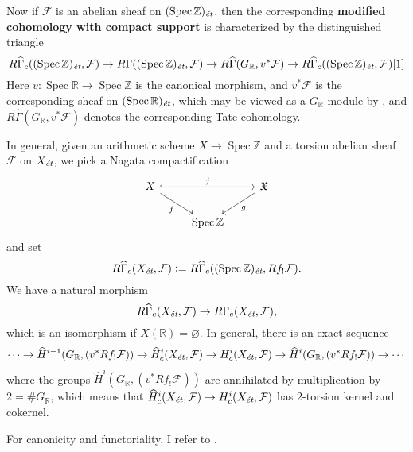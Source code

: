 \documentclass{article}
\DeclareMathOperator{\Spec}{Spec}
\newcommand{\RR}{\mathbb{R}}
\newcommand{\ZZ}{\mathbb{Z}}
\renewcommand{\emptyset}{\varnothing}
\newcommand{\et}{\text{\it ét}}
\newcommand{\dfn}{\mathrel{\mathop:}=}
\theoremstyle{definition}
\numberwithin{equation}{section}
\begin{document}
\begin{appendices}
Now if $\mathcal{F}$ is an abelian sheaf on $(\Spec \ZZ)_\et$, then the
corresponding \textbf{modified cohomology with compact support} is characterized
by the distinguished triangle
\[ R\widehat{\Gamma}_c ((\Spec \ZZ)_\et, \mathcal{F}) \to
R\Gamma ((\Spec \ZZ)_\et, \mathcal{F}) \to
R\widehat{\Gamma} (G_\RR, v^* \mathcal{F}) \to
R\widehat{\Gamma}_c ((\Spec \ZZ)_\et, \mathcal{F}) [1] \]
Here $v\colon \Spec \RR \to \Spec \ZZ$ is the canonical morphism, and
$v^* \mathcal{F}$ is the corresponding sheaf on $(\Spec \RR)_\et$, which may be
viewed as a $G_\RR$-module by \cite[Exposé~VII, 2.3]{SGA4}, and
$R\widehat{\Gamma} (G_\RR, v^* \mathcal{F})$ denotes the corresponding Tate
cohomology.

In general, given an arithmetic scheme $X \to \Spec \ZZ$ and a torsion abelian
sheaf $\mathcal{F}$ on $X_\et$, we pick a Nagata compactification
\[ \begin{tikzcd}
  X \ar[hookrightarrow]{rr}{j}\ar{dr}[swap]{f} & & \mathfrak{X} \ar{dl}{g} \\
  & \Spec \ZZ
\end{tikzcd} \]
and set
\[ R\widehat{\Gamma}_c (X_\et, \mathcal{F}) \dfn
R\widehat{\Gamma}_c ((\Spec \ZZ)_\et, R f_! \mathcal{F}). \]
We have a natural morphism
$$R\widehat{\Gamma}_c (X_\et, \mathcal{F}) \to R\Gamma_c (X_\et, \mathcal{F}),$$
which is an isomorphism if $X (\RR) = \emptyset$. In general, there is an
exact sequence
\[ \cdots \to \widehat{H}^{i-1} (G_\RR, (v^* Rf_! \mathcal{F})) \to
\widehat{H}^i_c (X_\et, \mathcal{F}) \to
H^i_c (X_\et, \mathcal{F}) \to
\widehat{H}^i (G_\RR, (v^* Rf_! \mathcal{F})) \to \cdots \]
where the groups $\widehat{H}^i (G_\RR, (v^* Rf_! \mathcal{F}))$ are annihilated
by multiplication by $2 = \# G_\RR$, which means that
$\widehat{H}^i_c (X_\et,\mathcal{F}) \to H^i_c (X_\et,\mathcal{F})$
has $2$-torsion kernel and cokernel.

For canonicity and functoriality, I refer to \cite[\S 2]{Geisser-Schmidt-2018}.
\end{appendices}


\pagebreak


\end{document}
